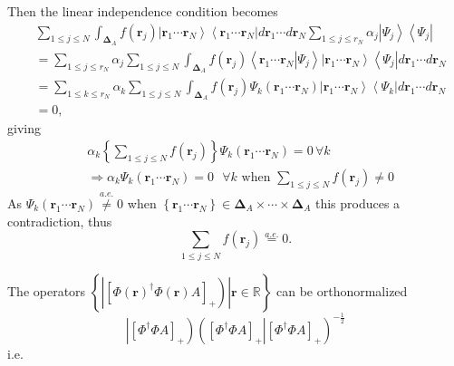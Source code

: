 \documentclass[aps,preprint]{revtex4}%
\begin{document}
Then the linear independence condition becomes
\begin{align}
&  \sum_{1\leq j\leq N}\int_{\boldsymbol{\Delta}_{A}}f\left(  \boldsymbol{r}%
_{j}\right)  \left\vert \boldsymbol{r}_{1}\cdots\boldsymbol{r}_{N}%
\right\rangle \left\langle \boldsymbol{r}_{1}\cdots\boldsymbol{r}%
_{N}\right\vert d\boldsymbol{r}_{1}\cdots d\boldsymbol{r}_{N}\sum_{1\leq j\leq
r_{N}}\alpha_{j}\left\vert \Psi_{j}\right\rangle \left\langle \Psi
_{j}\right\vert \\
&  =\sum_{1\leq j\leq r_{N}}\alpha_{j}\sum_{1\leq j\leq N}\int%
_{\boldsymbol{\Delta}_{A}}f\left(  \boldsymbol{r}_{j}\right)  \left\langle
\boldsymbol{r}_{1}\cdots\boldsymbol{r}_{N}\left\vert \Psi_{j}\right.
\right\rangle \left\vert \boldsymbol{r}_{1}\cdots\boldsymbol{r}_{N}%
\right\rangle \left\langle \Psi_{j}\right\vert d\boldsymbol{r}_{1}\cdots
d\boldsymbol{r}_{N}\\
&  =\sum_{1\leq k\leq r_{N}}\alpha_{k}\sum_{1\leq j\leq N}\int%
_{\boldsymbol{\Delta}_{A}}f\left(  \boldsymbol{r}_{j}\right)  \Psi_{k}\left(
\boldsymbol{r}_{1}\cdots\boldsymbol{r}_{N}\right)  \left\vert \boldsymbol{r}%
_{1}\cdots\boldsymbol{r}_{N}\right\rangle \left\langle \Psi_{k}\right\vert
d\boldsymbol{r}_{1}\cdots d\boldsymbol{r}_{N}\\
&  =0,
\end{align}
giving
\begin{align}
&  \alpha_{k}\left\{  \sum_{1\leq j\leq N}f\left(  \boldsymbol{r}_{j}\right)
\right\}  \Psi_{k}\left(  \boldsymbol{r}_{1}\cdots\boldsymbol{r}_{N}\right)
=0\,\forall k\\
&  \Rightarrow\alpha_{k}\Psi_{k}\left(  \boldsymbol{r}_{1}\cdots
\boldsymbol{r}_{N}\right)  =0\text{ }\forall k\text{ when }\sum_{1\leq j\leq
N}f\left(  \boldsymbol{r}_{j}\right)  \neq0
\end{align}
As $\Psi_{k}\left(  \boldsymbol{r}_{1}\cdots\boldsymbol{r}_{N}\right)
\overset{a.e.}{\neq}0$ when $\left\{  \boldsymbol{r}_{1}\cdots\boldsymbol{r}%
_{N}\right\}  \in\boldsymbol{\Delta}_{A}\times\cdots\times\boldsymbol{\Delta
}_{A}$ this produces a contradiction, thus
\begin{equation}
\sum_{1\leq j\leq N}f\left(  \boldsymbol{r}_{j}\right)  \overset{a.e.}{=}0.
\end{equation}


\bigskip The operators $\left\{  \left.  \left\vert \left[  \Phi\left(
\boldsymbol{r}\right)  ^{\dagger}\Phi\left(  \boldsymbol{r}\right)  A\right]
_{+}\right)  \right\vert \mathbf{r\in}\mathbb{R}\right\}  $ can be
orthonormalized
\begin{equation}
\left\vert \left[  \Phi^{\dagger}\Phi A\right]  _{+}\right)  \left(  \left.
\left[  \Phi^{\dagger}\Phi A\right]  _{+}\right\vert \left[  \Phi^{\dagger
}\Phi A\right]  _{+}\right)  ^{-\frac{1}{2}}%
\end{equation}
i.e. %
\end{document}
